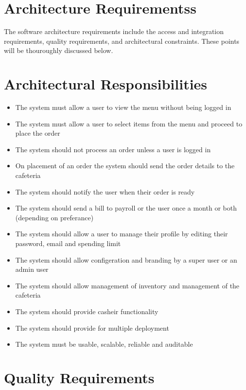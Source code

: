 \documentclass[a4paper,12pt]{article}
\begin{document}
\section{Architecture Requirementss}
The software architecture requirements include the access and integration requirements, quality
requirements, and architectural constraints. These points will be thouroughly discussed below.

\section{Architectural Responsibilities}
\begin{itemize}
\item The system must allow a user to view the menu without being logged in
\item The system must allow a user to select items from the menu and proceed to place the order
\item The system should not process an order unless a user is logged in
\item On placement of an order the system should send the order details to the cafeteria
\item The system should notify the user when their order is ready
\item The system should send a bill to payroll or the user  once a month or both (depending on preferance)
\item The system should allow a user to manage their profile by editing their password, email and spending limit
\item The system should allow configeration and branding by a super user or an  admin user
\item The system should allow management of inventory and management of the cafeteria
\item The system should provide casheir functionality
\item The system should provide for multiple deployment
\item The system must be usable, scalable, reliable and auditable
\end{itemize}

\section{Quality Requirements}
\end{document}
